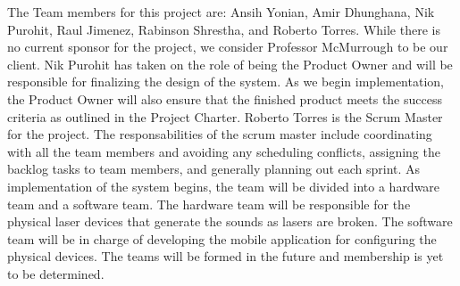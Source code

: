 The Team members for this project are: Ansih Yonian, Amir Dhunghana, Nik Purohit, Raul Jimenez, Rabinson Shrestha, and Roberto Torres. While there is no current sponsor for the project, we consider Professor McMurrough to be our client. Nik Purohit has taken on the role of being the Product Owner and will be responsible for finalizing the design of the system. As we begin implementation, the Product Owner will also ensure that the finished product meets the success criteria as outlined in the Project Charter. Roberto Torres is the Scrum Master for the project. The responsabilities of the scrum master include coordinating with all the team members and avoiding any scheduling conflicts, assigning the backlog tasks to team members, and generally planning out each sprint. As implementation of the system begins, the team will be divided into a hardware team and a software team. The hardware team will be responsible for the physical laser devices that generate the sounds as lasers are broken. The software team will be in charge of developing the mobile application for configuring the physical devices. The teams will be formed in the future and membership is yet to be determined.
